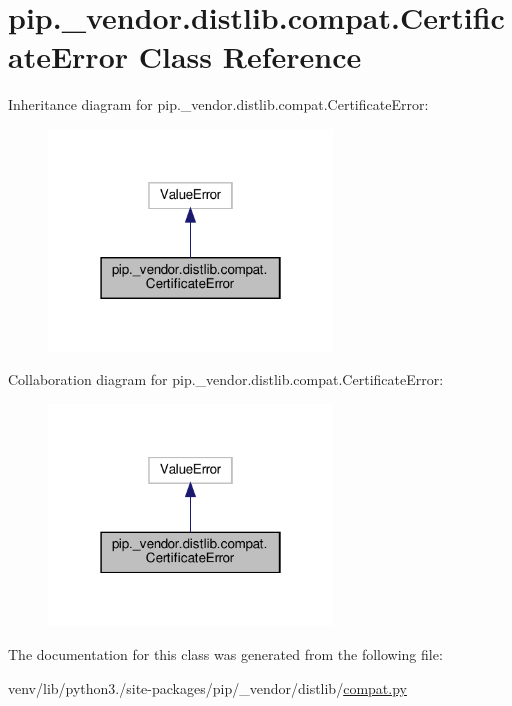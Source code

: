 \hypertarget{classpip_1_1__vendor_1_1distlib_1_1compat_1_1CertificateError}{}\section{pip.\+\_\+vendor.\+distlib.\+compat.\+Certificate\+Error Class Reference}
\label{classpip_1_1__vendor_1_1distlib_1_1compat_1_1CertificateError}


Inheritance diagram for pip.\+\_\+vendor.\+distlib.\+compat.\+Certificate\+Error\+:
\nopagebreak
\begin{figure}[H]
\begin{center}
\leavevmode
\includegraphics[width=214pt]{classpip_1_1__vendor_1_1distlib_1_1compat_1_1CertificateError__inherit__graph}
\end{center}
\end{figure}


Collaboration diagram for pip.\+\_\+vendor.\+distlib.\+compat.\+Certificate\+Error\+:
\nopagebreak
\begin{figure}[H]
\begin{center}
\leavevmode
\includegraphics[width=214pt]{classpip_1_1__vendor_1_1distlib_1_1compat_1_1CertificateError__coll__graph}
\end{center}
\end{figure}


The documentation for this class was generated from the following file\+:\begin{DoxyCompactItemize}
\item 
venv/lib/python3./site-\/packages/pip/\+\_\+vendor/distlib/\hyperlink{__vendor_2distlib_2compat_8py}{compat.\+py}\end{DoxyCompactItemize}
